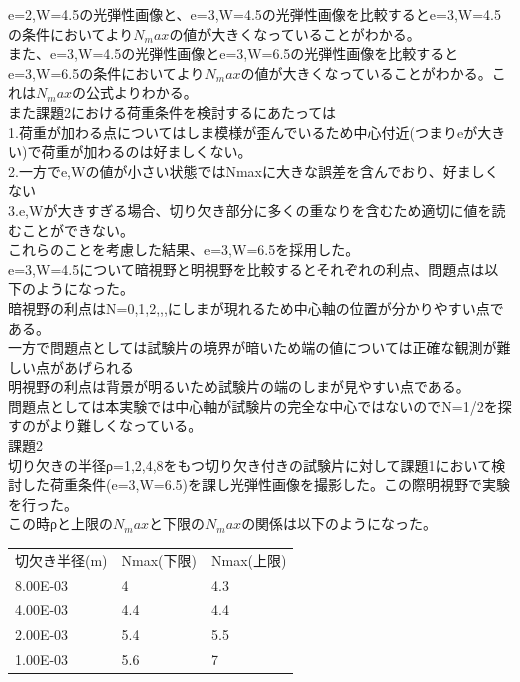 \documentclass[uplatex,dvipdfmx,titlepage]{jsarticle}
\begin{document}
e=2,W=4.5の光弾性画像と、e=3,W=4.5の光弾性画像を比較するとe=3,W=4.5の条件においてより$N_max$の値が大きくなっていることがわかる。\\
また、e=3,W=4.5の光弾性画像とe=3,W=6.5の光弾性画像を比較するとe=3,W=6.5の条件においてより$N_max$の値が大きくなっていることがわかる。これは$N_max$の公式よりわかる。\\
また課題2における荷重条件を検討するにあたっては\\
1.荷重が加わる点についてはしま模様が歪んでいるため中心付近(つまりeが大きい)で荷重が加わるのは好ましくない。\\
2.一方でe,Wの値が小さい状態ではNmaxに大きな誤差を含んでおり、好ましくない\\
3.e,Wが大きすぎる場合、切り欠き部分に多くの重なりを含むため適切に値を読むことができない。\\
これらのことを考慮した結果、e=3,W=6.5を採用した。\\
e=3,W=4.5について暗視野と明視野を比較するとそれぞれの利点、問題点は以下のようになった。\\
暗視野の利点はN=0,1,2,,,にしまが現れるため中心軸の位置が分かりやすい点である。\\
一方で問題点としては試験片の境界が暗いため端の値については正確な観測が難しい点があげられる\\
明視野の利点は背景が明るいため試験片の端のしまが見やすい点である。\\
問題点としては本実験では中心軸が試験片の完全な中心ではないのでN=1/2を探すのがより難しくなっている。\\

課題2\\
切り欠きの半径ρ=1,2,4,8をもつ切り欠き付きの試験片に対して課題1において検討した荷重条件(e=3,W=6.5)を課し光弾性画像を撮影した。この際明視野で実験を行った。\\
この時ρと上限の$N_max$と下限の$N_max$の関係は以下のようになった。
\begin{table}[]
\begin{tabular}{lll}
切欠き半径(m) & Nmax(下限) & Nmax(上限) \\
8.00E-03 & 4        & 4.3      \\
4.00E-03 & 4.4      & 4.4      \\
2.00E-03 & 5.4      & 5.5      \\
1.00E-03 & 5.6      & 7       
\end{tabular}
\end{table}
\end{document}

